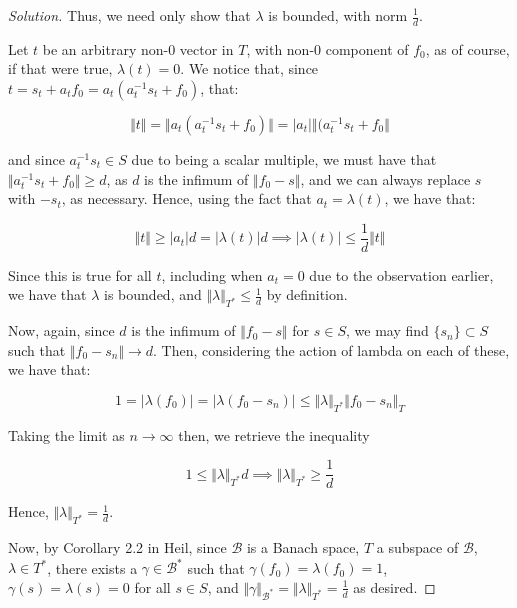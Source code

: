 \documentclass[10pt]{article}
\begin{document}
\begin{proof}[Solution]
Thus, we need only show that $\lambda$ is bounded, with norm $\frac{1}{d}$.

Let $t$ be an arbitrary non-0 vector in $T$, with non-0 component of $f_0$, as of course, if that were true, $\lambda(t) = 0$. We notice that, since $t = s_t + a_t f_0 = a_t( a_t^{-1} s_t + f_0)$, that:

$$ \Vert t \Vert = \Vert a_t( a_t^{-1} s_t + f_0) \Vert = | a_t | \Vert (a_t^{-1} s_t + f_0 \Vert$$

and since $a_t^{-1} s_t \in S$ due to being a scalar multiple, we must have that $\Vert a_t^{-1} s_t + f_0 \Vert \geq d$, as $d$ is the infimum of $\Vert f_0 - s \Vert$, and we can always replace $s$ with $-s_t$, as necessary. Hence, using the fact that $a_t = \lambda(t)$, we have that:

$$ \Vert t \Vert \geq |a_t| d = |\lambda(t) | d \implies |\lambda(t)| \leq \frac{1}{d} \Vert t \Vert $$

Since this is true for all $t$, including when $a_t = 0$ due to the observation earlier, we have that $\lambda$ is bounded, and $\Vert \lambda \Vert_{T^*} \leq \frac{1}{d}$ by definition.

Now, again, since $d$ is the infimum of $\Vert f_0 - s \Vert$ for $s \in S$, we may find $\{ s_n \} \subset S$ such that $\Vert f_0 - s_n \Vert \to d$. Then, considering the action of lambda on each of these, we have that:

$$ 1 = | \lambda(f_0) | = | \lambda(f_0 - s_n) |   \leq \Vert \lambda \Vert_{T^*} \Vert f_0 - s_n \Vert_T  $$

Taking the limit as $n \to \infty$ then, we retrieve the inequality

$$ 1 \leq \Vert \lambda \Vert_{T^*} d \implies \Vert \lambda \Vert_{T^*} \geq \frac{1}{d}$$

Hence, $\Vert \lambda \Vert_{T^*} = \frac{1}{d}$.

Now, by Corollary 2.2 in Heil, since $\mathcal{B}$ is a Banach space, $T$ a subspace of $\mathcal{B}$, $\lambda \in T^*$, there exists a $\gamma \in \mathcal{B}^*$ such that $\gamma(f_0) = \lambda(f_0) = 1$, $\gamma(s) = \lambda(s) = 0$ for all $s \in S$, and $\Vert \gamma \Vert_{\mathcal{B}^*} = \Vert \lambda \Vert_{T^*} = \frac{1}{d}$ as desired.
\end{proof}
\end{document}

